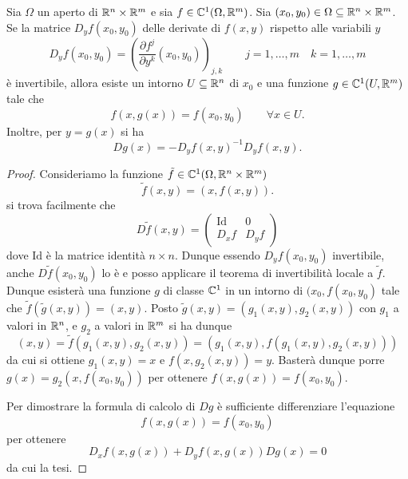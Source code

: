 \begin{theorem}
Sia $\Omega$ un aperto di ${\mathbb R}^n\times {\mathbb R}^m$ e sia $f\in
{\mathbb C}^1(\Omega,{\mathbb R}^m)$. Sia $(x_0,y_0)\in\Omega\subseteq {\mathbb R}^n\times {\mathbb R}^m$.
Se la matrice $D_yf(x_0,y_0)$ delle derivate di $f(x,y)$ rispetto alle
variabili $y$
\[
D_yf(x_0,y_0)=\left(\frac{\partial f^j}{\partial y^k} (x_0,y_0)\right)_{j,k}
\qquad j=1,\ldots,m\quad k=1,\ldots,m
\]
\`e invertibile, allora esiste un intorno $U\subseteq {\mathbb R}^n$ di $x_0$
e una funzione $g\in{\mathbb C}^1(U,{\mathbb R}^m)$
tale che
\[
        f(x,g(x))=f(x_0,y_0)\qquad \forall x\in U.
\]
Inoltre, per $y=g(x)$ si ha
\[
  Dg(x) = -D_y f(x,y)^{-1} D_y f(x,y).
\]
\end{theorem}
\begin{proof}
Consideriamo la funzione $\tilde f\in{\mathbb C}^1(\Omega,{\mathbb R}^n\times{\mathbb R}^m)$
\[
        \tilde f(x,y)=(x,f(x,y)).
\]
si trova facilmente che 
\[      
        D\tilde f(x,y) =
        \left(
        \begin{array}{c|c}
        \mathrm{Id} & 0 \\ \hline
        D_x f & D_y f
        \end{array}
        \right)
\]
dove $\mathrm{Id}$ \`e la matrice identit\`a $n\times n$. 
Dunque essendo $D_y f(x_0,y_0)$ invertibile,
 anche $D\tilde f(x_0,y_0)$ lo \`e e
posso applicare il teorema di invertibilit\`a locale a $\tilde f$.
Dunque esister\`a una funzione $g$ di classe ${\mathbb C}^1$ in un intorno di
$(x_0,f(x_0,y_0)$ 
tale che $\tilde f(\tilde
g(x,y))=(x,y)$.
Posto $\tilde g(x,y)=(g_1(x,y),g_2(x,y))$ con $g_1$ a valori in
${\mathbb R}^n$, e $g_2$ a valori in ${\mathbb R}^m$ si ha dunque
\[
        (x,y) 
        = \tilde f(g_1(x,y),g_2(x,y))
        = (g_1(x,y),f(g_1(x,y),g_2(x,y)))
\]
da cui si ottiene $g_1(x,y)=x$ e
$f(x,g_2(x,y))=y$.
Baster\`a dunque porre $g(x)=g_2(x,f(x_0,y_0))$ per ottenere $f(x,g(x))=f(x_0,y_0)$.

Per dimostrare la formula di calcolo di $Dg$ \`e sufficiente
differenziare l'equazione
\[
  f(x,g(x))=f(x_0,y_0)
\]
per ottenere
\[
  D_x f(x,g(x)) + D_y f(x,g(x)) Dg(x)=0
\]
da cui la tesi.
\end{proof}

